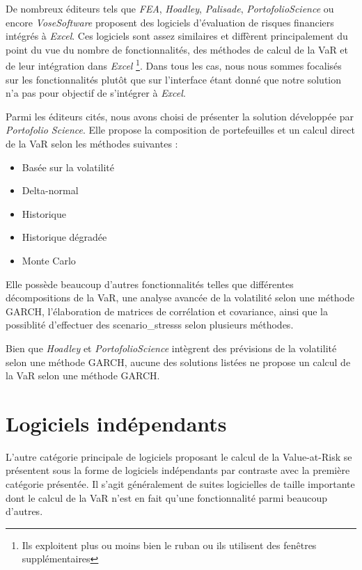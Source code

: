 		De nombreux éditeurs tels que \textit{FEA}, \textit{Hoadley}, \textit{Palisade}, \textit{PortofolioScience} ou encore \textit{VoseSoftware} proposent des logiciels d'évaluation de risques financiers intégrés à \textit{Excel}. Ces logiciels sont assez similaires et diffèrent principalement du point du vue du nombre de fonctionnalités, des méthodes de calcul de la VaR et de leur intégration dans \textit{Excel} \footnote{Ils exploitent plus ou moins bien le \gls{ruban} ou ils utilisent des fenêtres supplémentaires}. Dans tous les cas, nous nous sommes focalisés sur les fonctionnalités plutôt que sur l'interface étant donné que notre solution n'a pas pour objectif de s'intégrer à \textit{Excel}.
		\nocite{website:FEA}
		\nocite{website:Hoadley}
		\nocite{website:Palisade}
		\nocite{website:PortofolioScience}
		\nocite{website:VoseSoftware}

		Parmi les éditeurs cités, nous avons choisi de présenter la solution développée par \textit{Portofolio Science}. Elle propose la composition de portefeuilles et un calcul direct de la VaR selon les méthodes suivantes :
		\begin{itemize}
			\item Basée sur la volatilité
			\item Delta-normal
			\item Historique
			\item Historique dégradée
			\item Monte Carlo
		\end{itemize}

		Elle possède beaucoup d'autres fonctionnalités telles que différentes décompositions de la VaR, une analyse avancée de la volatilité selon une méthode GARCH, l'élaboration de matrices de corrélation et covariance, ainsi que la possiblité d'effectuer des \glspl{scenario_stress} selon plusieurs méthodes. 

		Bien que \textit{Hoadley} et \textit{PortofolioScience} intègrent des prévisions de la volatilité selon une méthode GARCH, aucune des solutions listées ne propose un calcul de la VaR selon une méthode GARCH.


	\section{Logiciels indépendants}

		L'autre catégorie principale de logiciels proposant le calcul de la Value-at-Risk se présentent sous la forme de logiciels indépendants par contraste avec la première catégorie présentée. Il s'agit généralement de suites logicielles de taille importante dont le calcul de la VaR n'est en fait qu'une fonctionnalité parmi beaucoup d'autres.

